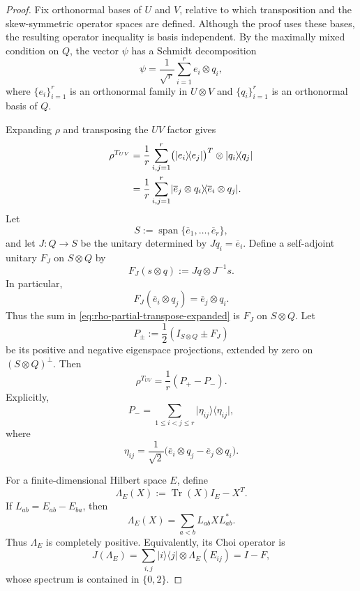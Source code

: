 \documentclass[11pt,reqno]{amsart}
\theoremstyle{remark}
\DeclareMathOperator{\Tr}{Tr}
\newcommand{\ketbra}[2]{\lvert #1\rangle\!\langle #2\rvert}
\begin{document}
\begin{proof}
Fix orthonormal bases of $U$ and $V$, relative to which transposition
and the skew-symmetric operator spaces are defined. Although the proof
uses these bases, the resulting operator inequality is basis
independent. By the maximally mixed condition on $Q$, the vector $\psi$
has a Schmidt decomposition
\begin{equation}
\label{eq:psi-schmidt}
    \psi
    =
    \frac1{\sqrt r}
    \sum_{i=1}^r e_i\otimes q_i,
\end{equation}
where $\{e_i\}_{i=1}^r$ is an orthonormal family in $U\otimes V$ and
$\{q_i\}_{i=1}^r$ is an orthonormal basis of $Q$.

Expanding $\rho$ and transposing the $UV$ factor gives
\begin{align}
    \rho^{T_{UV}}
    &=
    \frac1r
    \sum_{i,j=1}^r
    \bigl(\ketbra{e_i}{e_j}\bigr)^T
    \otimes\ketbra{q_i}{q_j}
    \notag\\
    &=
    \frac1r
    \sum_{i,j=1}^r
    \ketbra{\overline e_j\otimes q_i}
            {\overline e_i\otimes q_j}.
\label{eq:rho-partial-transpose-expanded}
\end{align}
Let
\[
    S:=\operatorname{span}
    \{\overline e_1,\ldots,\overline e_r\},
\]
and let $J:Q\to S$ be the unitary determined by
$Jq_i=\overline e_i$. Define a self-adjoint unitary $F_J$ on
$S\otimes Q$ by
\[
    F_J(s\otimes q)
    :=Jq\otimes J^{-1}s.
\]
In particular,
\[
    F_J(\overline e_i\otimes q_j)
    =\overline e_j\otimes q_i.
\]
Thus the sum in \cref{eq:rho-partial-transpose-expanded} is $F_J$ on
$S\otimes Q$. Let
\[
    P_\pm:=\frac12(I_{S\otimes Q}\pm F_J)
\]
be its positive and negative eigenspace projections, extended by zero
on $(S\otimes Q)^\perp$. Then
\begin{equation}
\label{eq:rho-partial-transpose}
    \rho^{T_{UV}}
    =
    \frac1r(P_+-P_-).
\end{equation}
Explicitly,
\[
    P_-
    =
    \sum_{1\le i<j\le r}
    \ketbra{\eta_{ij}}{\eta_{ij}},
\]
where
\begin{equation}
\label{eq:eta-ij}
    \eta_{ij}
    =
    \frac1{\sqrt2}
    \bigl(
      \overline e_i\otimes q_j
      -
      \overline e_j\otimes q_i
    \bigr).
\end{equation}

For a finite-dimensional Hilbert space $E$, define
\[
    \Lambda_E(X)
    :=
    \Tr(X)I_E-X^T.
\]
If $L_{ab}=E_{ab}-E_{ba}$, then
\begin{equation}
\label{eq:Lambda-kraus}
    \Lambda_E(X)
    =
    \sum_{a<b}L_{ab}XL_{ab}^*.
\end{equation}
Thus $\Lambda_E$ is completely positive. Equivalently, its Choi
operator is
\[
    J(\Lambda_E)
    =
    \sum_{i,j}
    \ketbra{i}{j}\otimes\Lambda_E(E_{ij})
    =
    I-F,
\]
whose spectrum is contained in $\{0,2\}$.


\end{proof}
\end{document}
